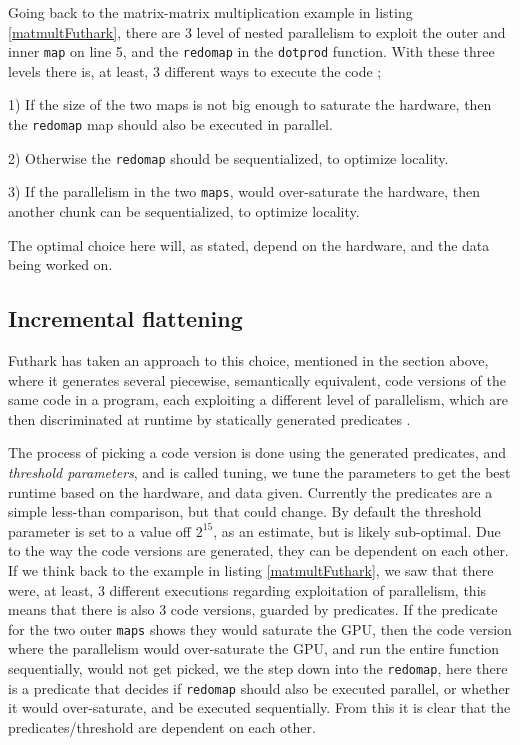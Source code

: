 Going back to the matrix-matrix multiplication example in listing \ref{matmultFuthark}, there are 3 level of nested parallelism to exploit the outer and inner \texttt{map} on line 5, and the \texttt{redomap} in the \texttt{dotprod} function. With these three levels there is, at least, 3 different ways to execute the code \cite{inc-flat};
\begin{inparadesc}
	\item[1)] If the size of the two maps is not big enough to saturate the hardware, then the \texttt{redomap} map should also be executed in parallel.
	\item[2)] Otherwise the \texttt{redomap} should be sequentialized, to optimize locality.
	\item[3)] If the parallelism in the two \texttt{maps}, would over-saturate the hardware, then another chunk can be sequentialized, to optimize locality. 
\end{inparadesc} 

The optimal choice here will, as stated, depend on the hardware, and the data being worked on.
\subsection{Incremental flattening}
Futhark has taken an approach to this choice, mentioned in the section above, where it generates several piecewise, semantically equivalent, code versions of the same code in a program, each exploiting a different level of parallelism, which are then discriminated at runtime by statically generated predicates \cite{inc-flat}.

The process of picking a code version is done using the generated predicates, and \textit{threshold parameters}, and is called tuning, we tune the parameters to get the best runtime based on the hardware, and data given. Currently the predicates are a simple less-than comparison, but that could change. By default the threshold parameter is set to a value off $2^{15}$, as an estimate, but is likely sub-optimal. Due to the way the code versions are generated, they can be dependent on each other. If we think back to the example in listing \ref{matmultFuthark}, we saw that there were, at least, 3 different executions regarding exploitation of parallelism, this means that there is also 3 code versions, guarded by predicates. If the predicate for the two outer \texttt{maps} shows they would saturate the GPU, then the code version where the parallelism would over-saturate the GPU, and run the entire function sequentially, would not get picked, we the step down into the \texttt{redomap}, here there is a predicate that decides if \texttt{redomap} should also be executed parallel, or whether it would over-saturate, and be executed sequentially. From this it is clear that the predicates/threshold are dependent on each other.

